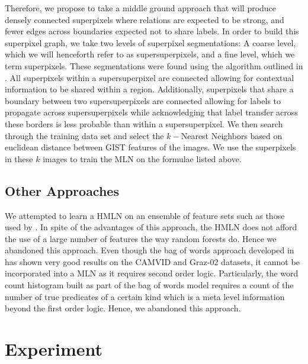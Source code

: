 \documentclass{article} %
\begin{document}
Therefore, we propose to take a middle ground approach that will produce densely connected superpixels where relations are expected to be strong, and fewer edges across boundaries expected not to share labels. In order to build this superpixel graph, we take two levels of superpixel segmentations: A coarse level, which we will henceforth refer to as supersuperpixels, and a fine level, which we term superpixels. These segmentations were found using the algorithm outlined in \cite{Superpixel}. All superpixels within a supersuperpixel are connected allowing for contextual information to be shared within a region. Additionally, superpixels that share a boundary between two supersuperpixels are connected allowing for labels to propagate across supersuperpixels while acknowledging that label transfer across these borders is less probable than within a supersuperpixel. We then search through the training data set and select the $k-$Nearest Neighbors based on euclidean distance between GIST features \cite{Gist} of the images. We use the superpixels in these $k$ images to train the MLN on the formulae listed above.

\subsection{Other Approaches}
\label{sec:IterContFor}
We attempted to learn a HMLN on an ensemble of feature sets such as those used by \cite{IterContFor12}. In spite of the advantages of this approach, the HMLN does not afford the use of a large number of features the way random forests do. Hence we abandoned this approach. 
\label{sec:BofWordApp}
Even though the bag of words approach developed in \cite{visualdictrene} has shown very good results on the CAMVID\cite{BrostowFC:PRL2008} and Graz-02 \cite{graz02} datasets, it cannot be incorporated into a MLN as it requires second order logic. Particularly, the word count histogram built as part of the bag of words model requires a count of the number of true predicates of a certain kind which is a meta level information beyond the first order logic. Hence, we abandoned this approach.

\section{Experiment}
\label{sec:Exp}
\end{document}
